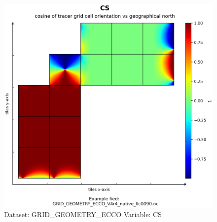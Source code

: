 \begin{figure}[H]
\centering
\includegraphics[width=\textwidth]{../images/plots/native_plots_coords/Geometry_Parameters_for_the_Lat-Lon-Cap_90_(llc90)_Native_Model_Grid_(Version_4_Release_4)/CS.png}
\caption{Dataset: GRID\_GEOMETRY\_ECCO Variable: CS}
\label{tab:table-GRID_GEOMETRY_ECCO_CS-Plot}
\end{figure}
\pagebreak
